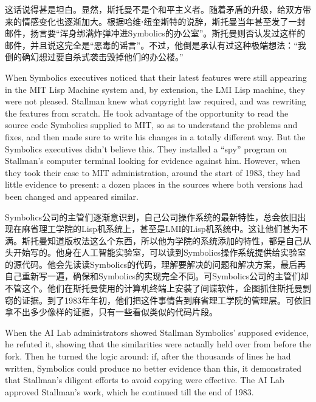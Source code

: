 \ifdefined\chs
这话说得甚是坦白。显然，斯托曼不是个和平主义者。随着矛盾的升级，给双方带来的情感变化也逐渐加大。根据哈维⋅纽奎斯特的说辞，斯托曼当年甚至发了一封邮件，扬言要``浑身绑满炸弹冲进Symbolics的办公室''。斯托曼则否认发过这样的邮件，并且说这完全是``恶毒的谣言''。不过，他倒是承认有过这种极端想法：``我倒的确幻想过要自杀式袭击毁掉他们的办公楼。''
\fi
\fi

\ifdefined\vtwo
\ifdefined\eng
When Symbolics executives noticed that their latest features were still appearing in the MIT Lisp Machine system and, by extension, the LMI Lisp machine, they were not pleased. Stallman knew what copyright law required, and was rewriting the features from scratch.  He took advantage of the opportunity to read the source code Symbolics supplied to MIT, so as to understand the problems and fixes, and then made sure to write his changes in a totally different way.  But the Symbolics executives didn't believe this.  They installed a ``spy'' program on Stallman's computer terminal looking for evidence against him.  However, when they took their case to MIT administration, around the start of 1983, they had little evidence to present: a dozen places in the sources where both versions had been changed and appeared similar.
\fi

\ifdefined\chs
Symbolics公司的主管们逐渐意识到，自己公司操作系统的最新特性，总会依旧出现在麻省理工学院的Lisp机系统上，甚至是LMI的Lisp机系统中。这让他们甚为不满。斯托曼知道版权法这么个东西，所以他为学院的系统添加的特性，都是自己从头开始写的。他身在人工智能实验室，可以读到Symbolics操作系统提供给实验室的源代码。他会先读读Symbolics的代码，理解要解决的问题和解决方案，最后再自己重新写一遍，确保和Symbolics的实现完全不同。可Symbolics公司的主管们却不管这个。他们在斯托曼使用的计算机终端上安装了间谍软件，企图抓住斯托曼剽窃的证据。到了1983年年初，他们把这件事情告到麻省理工学院的管理层。可依旧拿不出多少像样的证据，只有一些看似类似的代码片段。
\fi

\ifdefined\eng
When the AI Lab administrators showed Stallman Symbolics' supposed evidence, he refuted it, showing that the similarities were actually held over from before the fork.  Then he turned the logic around: if, after the thousands of lines he had written, Symbolics could produce no better evidence than this, it demonstrated that Stallman's diligent efforts to avoid copying were effective.  The AI Lab approved Stallman's work, which he continued till the end of 1983.
\fi

